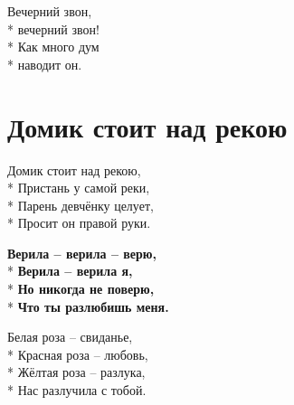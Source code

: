 \medskip

\begin{minipage}{\linewidth}
Вечерний звон,\\*
вечерний звон!\\*
Как много дум\\*
наводит он.\\
\end{minipage}

\vspace{\fill}\newpage

\section{Домик стоит над рекою}
\label{song:Домик_стоит_над_рекою}

\medskip

\begin{minipage}{\linewidth}
Домик стоит над рекою,\\*
Пристань у самой реки,\\*
Парень девчёнку целует,\\*
Просит он правой руки.\\
\end{minipage}\par\medskip\nobreak

\medskip

\begin{minipage}{\linewidth}
\hspace*{1.5em}\textbf{Верила – верила – верю,}\\*
\hspace*{1.5em}\textbf{Верила – верила я,}\\*
\hspace*{1.5em}\textbf{Но никогда не поверю,}\\*
\hspace*{1.5em}\textbf{Что ты разлюбишь меня.}\\
\end{minipage}\par\medskip\nobreak

\medskip

\begin{minipage}{\linewidth}
Белая роза – свиданье,\\*
Красная роза – любовь,\\*
Жёлтая роза – разлука,\\*
Нас разлучила с тобой.\\
\end{minipage}\par\medskip\nobreak

